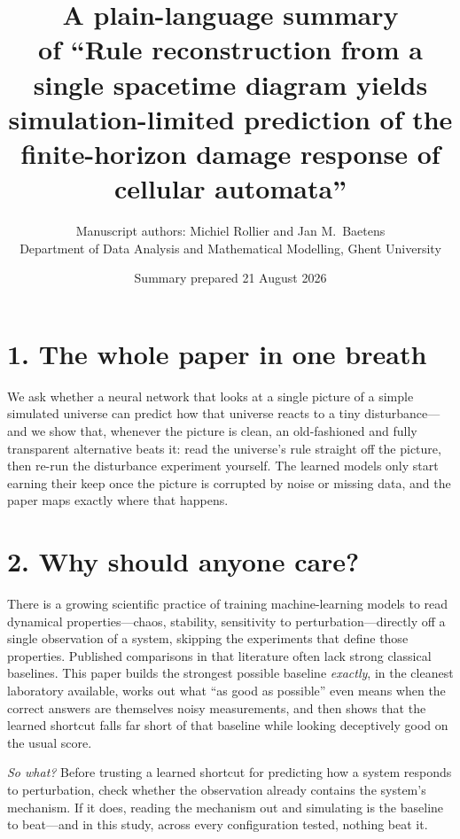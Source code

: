 \documentclass[11pt,a4paper]{article}
\title{\Large\textbf{A plain-language summary}\\[6pt]
\large of ``Rule reconstruction from a single spacetime diagram yields
simulation-limited prediction of the finite-horizon damage response of
cellular automata''}
\author{Manuscript authors: Michiel Rollier and Jan M.\ Baetens\\
\normalsize Department of Data Analysis and Mathematical Modelling, Ghent University}
\date{Summary prepared 21 August 2026}
\newcommand{\sowhat}[1]{\emph{So what?} #1}
\begin{document}
\maketitle

\noindent{}

\section*{1. The whole paper in one breath}

We ask whether a neural network that looks at a single picture of a simple
simulated universe can predict how that universe reacts to a tiny
disturbance---and we show that, whenever the picture is clean, an
old-fashioned and fully transparent alternative beats it: read the
universe's rule straight off the picture, then re-run the disturbance
experiment yourself. The learned models only start earning their keep once
the picture is corrupted by noise or missing data, and the paper maps
exactly where that happens.

\section*{2. Why should anyone care?}

There is a growing scientific practice of training machine-learning models
to read dynamical properties---chaos, stability, sensitivity to
perturbation---directly off a single observation of a system, skipping the
experiments that define those properties. Published comparisons in that
literature often lack strong classical baselines. This paper builds the
strongest possible baseline \emph{exactly}, in the cleanest laboratory
available, works out what ``as good as possible'' even means when the
correct answers are themselves noisy measurements, and then shows that the
learned shortcut falls far short of that baseline while looking deceptively
good on the usual score.

\sowhat{Before trusting a learned shortcut for predicting how a system
responds to perturbation, check whether the observation already contains the
system's mechanism. If it does, reading the mechanism out and simulating is
the baseline to beat---and in this study, across every configuration tested,
nothing beat it.}
\end{document}
